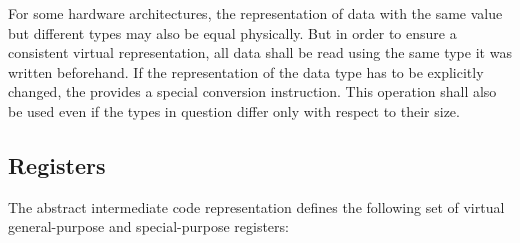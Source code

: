 For some hardware architectures, the representation of data with the same value but different types may also be equal physically.
But in order to ensure a consistent virtual representation, all data shall be read using the same type it was written beforehand.
If the representation of the data type has to be explicitly changed, the \ecs{} provides a special conversion instruction.
This operation shall also be used even if the types in question differ only with respect to their size.

\subsection{Registers}\label{sec:cdregisters}

The abstract intermediate code representation defines the following set of virtual general-purpose and special-purpose registers:

